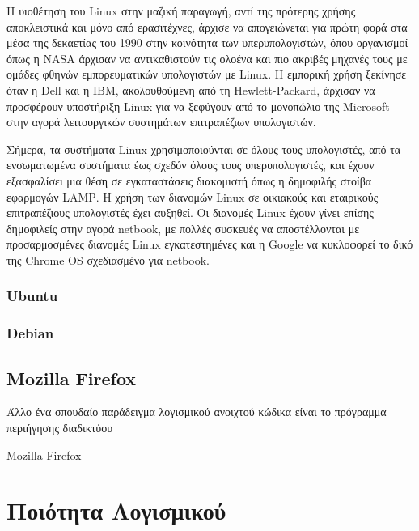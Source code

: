 \documentclass{article}
\begin{document}
{Η υιοθέτηση του Linux στην μαζική παραγωγή, αντί της πρότερης χρήσης αποκλειστικά και μόνο από ερασιτέχνες, άρχισε να απογειώνεται για πρώτη φορά στα μέσα της δεκαετίας του 1990 στην κοινότητα των υπερυπολογιστών, όπου οργανισμοί όπως η \textlatin{NASA} άρχισαν να αντικαθιστούν τις ολοένα και πιο ακριβές μηχανές τους με ομάδες φθηνών εμπορευματικών υπολογιστών με \textlatin{Linux}. Η εμπορική χρήση ξεκίνησε όταν η \textlatin{Dell} και η \textlatin{IBM}, ακολουθούμενη από τη \textlatin{Hewlett-Packard}, άρχισαν να προσφέρουν υποστήριξη \textlatin{Linux} για να ξεφύγουν από το μονοπώλιο της \textlatin{Microsoft} στην αγορά λειτουργικών συστημάτων επιτραπέζιων υπολογιστών.

Σήμερα, τα συστήματα \textlatin{Linux} χρησιμοποιούνται σε όλους τους υπολογιστές, από τα ενσωματωμένα συστήματα έως σχεδόν όλους τους υπερυπολογιστές, και έχουν εξασφαλίσει μια θέση σε εγκαταστάσεις διακομιστή όπως η δημοφιλής στοίβα εφαρμογών \textlatin{LAMP}. Η χρήση των διανομών \textlatin{Linux} σε οικιακούς και εταιρικούς επιτραπέζιους υπολογιστές έχει αυξηθεί. Οι διανομές \textlatin{Linux} έχουν γίνει επίσης δημοφιλείς στην αγορά netbook, με πολλές συσκευές να αποστέλλονται με προσαρμοσμένες διανομές \textlatin{Linux} εγκατεστημένες και η \textlatin{Google} να κυκλοφορεί το δικό της \textlatin{Chrome OS} σχεδιασμένο για \textlatin{netbook}.


\subsubsection{\textlatin{Ubuntu}}

\subsubsection{\textlatin{Debian}}

\subsection{\textlatin{Mozilla Firefox}}
\indent Άλλο ένα σπουδαίο παράδειγμα λογισμικού ανοιχτού κώδικα είναι το πρόγραμμα περιήγησης διαδικτύου {\textlatin{Mozilla Firefox}


\section{Ποιότητα Λογισμικού}
}}
\end{document}
